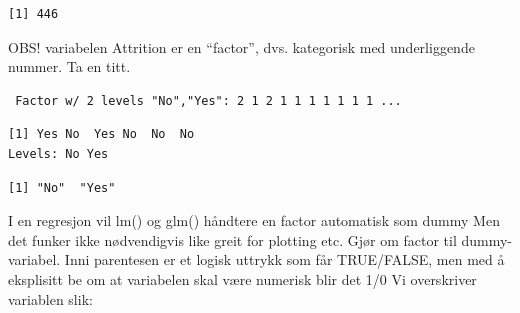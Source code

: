 \documentclass[
  letterpaper,
  DIV=11,
  numbers=noendperiod]{scrreprt}
\newenvironment{Shaded}{\begin{snugshade}}{\end{snugshade}}
\newcommand{\FunctionTok}[1]{\textcolor[rgb]{0.28,0.35,0.67}{#1}}
\newcommand{\NormalTok}[1]{\textcolor[rgb]{0.00,0.23,0.31}{#1}}
\newcommand{\OtherTok}[1]{\textcolor[rgb]{0.00,0.23,0.31}{#1}}
\newcommand{\SpecialCharTok}[1]{\textcolor[rgb]{0.37,0.37,0.37}{#1}}
\newcommand{\StringTok}[1]{\textcolor[rgb]{0.13,0.47,0.30}{#1}}
\theoremstyle{definition}
\theoremstyle{remark}
\begin{document}
\begin{verbatim}
[1] 446
\end{verbatim}

OBS! variabelen Attrition er en ``factor'', dvs. kategorisk med
underliggende nummer. Ta en titt.

\begin{Shaded}
\end{Shaded}

\begin{verbatim}
 Factor w/ 2 levels "No","Yes": 2 1 2 1 1 1 1 1 1 1 ...
\end{verbatim}

\begin{Shaded}
\end{Shaded}

\begin{verbatim}
[1] Yes No  Yes No  No  No 
Levels: No Yes
\end{verbatim}

\begin{Shaded}
\end{Shaded}

\begin{verbatim}
[1] "No"  "Yes"
\end{verbatim}

I en regresjon vil lm() og glm() håndtere en factor automatisk som dummy
Men det funker ikke nødvendigvis like greit for plotting etc. Gjør om
factor til dummy-variabel. Inni parentesen er et logisk uttrykk som får
TRUE/FALSE, men med å eksplisitt be om at variabelen skal være numerisk
blir det 1/0 Vi overskriver variablen slik:

\begin{Shaded}
\end{Shaded}
\end{document}
